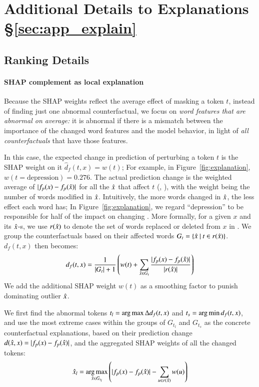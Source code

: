 \section{Additional Details to Explanations \S\ref{sec:app_explain}}
\label{appendix:explanation}


\subsection{Ranking Details}
\label{appendix:exp_rank}

\paragraph{SHAP complement as local explanation}
Because the SHAP weights reflect the average effect of masking a token $t$, instead of finding just one abnormal counterfactual, we focus on \emph{word features that are abnormal on average:} 
it is abnormal if there is a mismatch between the importance of the changed word features and the model behavior, in light of \emph{all counterfactuals} that have those features.

In this case, the expected change in prediction of perturbing a token $t$ is the SHAP weight on it $\hat{d}_f(t, x) = w(t)$; 
For example, in Figure~\ref{fig:explanation}, $w(t=\text{{depression}})=0.276$.
The actual prediction change is the weighted average of $|f_p(x)-f_p(\hat{x})|$ for all the $\hat{x}$ that affect $t$ (, ), with the weight being the number of words modified in $\hat{x}$. 
Intuitively, the more words changed in $\hat{x}$, the less effect each word has; In Figure~\ref{fig:explanation}, we regard ``depression'' to be responsible for half of the impact on changing .
More formally, for a given $x$ and its $\hat{x}$-s, we use $r(\hat{x})$ to denote the set of words replaced or deleted from $x$ in \relation{\xp}.
We group the counterfactuals based on their affected words $G_t = \{\hat{x}\ |\ t \in r(\hat{x})\}$. $d_f(t, x)$ then becomes:
$$d_f(t, x) = \frac{1}{|G_t|+1} \left(w(t) + \sum_{\hat{x} \in G_t} \frac{|f_p(x)-f_p(\hat{x})|}{|r(\hat{x})|}\right)$$
We add the additional SHAP weight $w(t)$ as a smoothing factor to punish dominating outlier $\hat{x}$.

We first find the abnormal tokens $t_l = \operatorname*{arg\,max} \Delta d_f(t, x)$ and $t_s = \operatorname*{arg\,min} d_f(t, x)$, and use the most extreme cases within the groups of $G_{t_l}$ and $G_{t_s}$ as the concrete counterfactual explanations, based on their prediction change $d(\hat{x}, x) = |f_p(x)-f_p(\hat{x})|$, and the aggregated SHAP weights of all the changed tokens:
$$\hat{x}_l = \operatorname*{arg\,max}_{\hat{x} \in G_{t_l}} \left( |f_p(x)-f_p(\hat{x})| - \sum_{u\in r(\hat{x})} w(u) \right)$$ 



